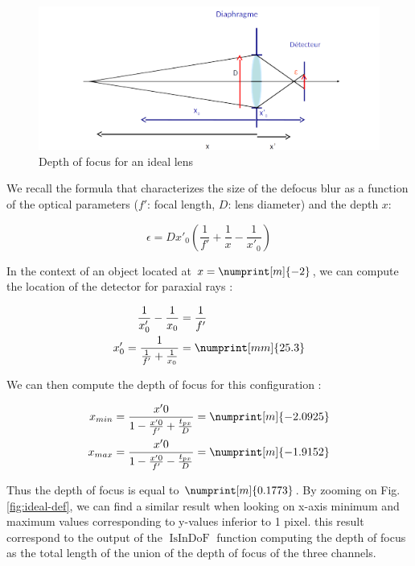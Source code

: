 \documentclass[10pt,letterpaper]{article}
\begin{document}
\begin{figure}[h]
	\centering
	\includegraphics[scale=0.75]{Ideal_lens.png}
	\caption{Depth of focus for an ideal lens}
	\label{fig:ideal-lens}
\end{figure}
\pagebreak

We recall the formula that characterizes the size of the defocus blur as a function of the optical parameters ($f'$: focal length, $D$: lens diameter) and the depth $x$:

\begin{equation}\label{eqn:dof}
    \epsilon = D x'_0 \left( \frac{1}{f'} + \frac{1}{x} - \frac{1}{x'_0} \right)
\end{equation}
    

In the context of an object located at $x=\numprint[m]{-2}$, we can compute the location of the detector for paraxial rays :

\begin{align}
    \frac{1}{x'_0} - \frac{1}{x_0} &= \frac{1}{f'}\\
    x'_0=\frac{1}{\frac{1}{f'} + \frac{1}{x_0}} &= \numprint[mm]{25.3}
\end{align}

We can then compute the depth of focus for this configuration :

\begin{align}
    x_{min} &= \frac{x'0}{1-\frac{x'0}{f'} + \frac{t_{px}}{D}} = \numprint[m]{-2.0925}\\
    x_{max} &= \frac{x'0}{1-\frac{x'0}{f'} - \frac{t_{px}}{D}} = \numprint[m]{-1.9152}
\end{align}

Thus the depth of focus is equal to $\numprint[m]{0.1773}$. By zooming on Fig. \ref{fig:ideal-def}, we can find a similar result when looking on x-axis minimum and maximum values corresponding to y-values inferior to 1 pixel. this result correspond to the output of the $\operatorname{IsInDoF}$ function computing the depth of focus as the total length of the union of the depth of focus of the three channels.
\end{document}
